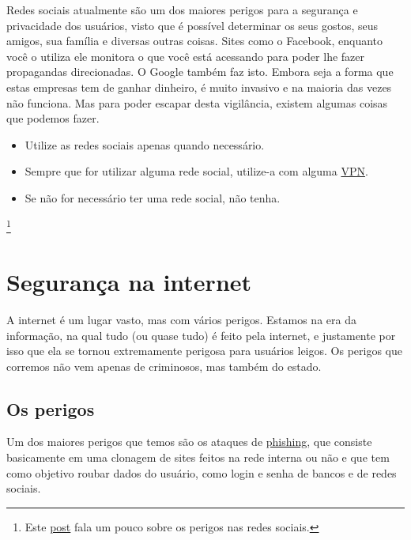 \documentclass[12pt, letterpaper, Monospace:12]{report}
\begin{document}
	Redes sociais atualmente são um dos maiores perigos para a segurança e privacidade dos usuários, visto que é possível determinar os seus gostos, seus amigos, sua família e diversas outras coisas. Sites como o Facebook, enquanto você o utiliza ele monitora o que você está acessando para poder lhe fazer propagandas direcionadas. O Google também faz isto. Embora seja a forma que estas empresas tem de ganhar dinheiro, é muito invasivo e na maioria das vezes não funciona. Mas para poder escapar desta vigilância, existem algumas coisas que podemos fazer.\\
	\begin{itemize} %
		\item Utilize as redes sociais apenas quando necessário.
		\item Sempre que for utilizar alguma rede social, utilize-a com alguma \href{https://criptowiki.miraheze.org/wiki/VPN_(Virtual_Private_Network)}{VPN}.
		\item Se não for necessário ter uma rede social, não tenha.
	\end{itemize} %

 \footnote{Este \href{https://www.linkedin.com/pulse/você-está-cuidando-da-sua-privacidade-na-internet-bruno-bustamante}{post} fala um pouco sobre os perigos nas redes sociais.}

\pagebreak %

\section{Segurança na internet}
	A internet é um lugar vasto, mas com vários perigos. Estamos na era da informação, na qual tudo (ou quase tudo) é feito pela internet, e justamente por isso que ela se tornou extremamente perigosa para usuários leigos. Os perigos que corremos não vem apenas de criminosos, mas também do estado.\\

\subsection{Os perigos}

	Um dos maiores perigos que temos são os ataques de \href{https://criptowiki.miraheze.org/wiki/Phishing}{phishing}, que consiste basicamente em uma clonagem de sites feitos na rede interna ou não e que tem como objetivo roubar dados do usuário, como login e senha de bancos e de redes sociais.\\
\end{document}
